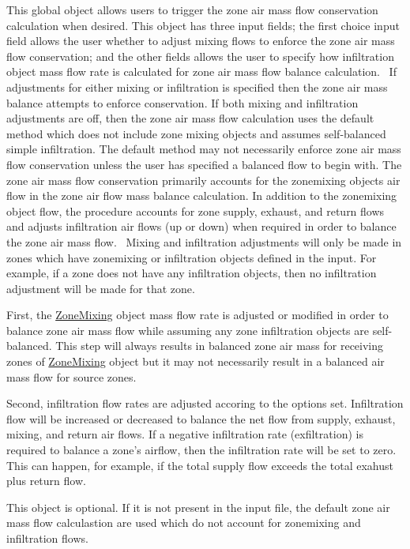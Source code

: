 This global object allows users to trigger the zone air mass flow conservation calculation when desired. This object has three input fields; the first choice input field allows the user whether to adjust mixing flows to enforce the zone air mass flow conservation; and the other fields allows the user to specify how infiltration object mass flow rate is calculated for zone air mass flow balance calculation.~ If adjustments for either mixing or infiltration is specified then the zone air mass balance attempts to enforce conservation. If both mixing and infiltration adjustments are off, then the zone air mass flow calculation uses the default method which does not include zone mixing objects and assumes self-balanced simple infiltration. The default method may not necessarily enforce zone air mass flow conservation unless the user has specified a balanced flow to begin with. The zone air mass flow conservation primarily accounts for the zonemixing objects air flow in the zone air flow mass balance calculation. In addition to the zonemixing object flow, the procedure accounts for zone supply, exhaust, and return flows and adjusts infiltration air flows (up or down) when required in order to balance the zone air mass flow.~ Mixing and infiltration adjustments will only be made in zones which have zonemixing or infiltration objects defined in the input. For example, if a zone does not have any infiltration objects, then no infiltration adjustment will be made for that zone.

First, the \hyperref[zonemixing]{ZoneMixing} object mass flow rate is adjusted or modified in order to balance zone air mass flow while assuming any zone infiltration objects are self-balanced. This step will always results in balanced zone air mass for receiving zones of \hyperref[zonemixing]{ZoneMixing} object but it may not necessarily result in a balanced air mass flow for source zones.~

Second, infiltration flow rates are adjusted accoring to the options set. Infiltration flow will be increased or decreased to balance the net flow from supply, exhaust, mixing, and return air flows. If a negative infiltration rate (exfiltration) is required to balance a zone's airflow, then the infiltration rate will be set to zero. This can happen, for example, if the total supply flow exceeds the total exahust plus return flow.

This object is optional. If it is not present in the input file, the default zone air mass flow calculastion are used which do not account for zonemixing and infiltration flows.

